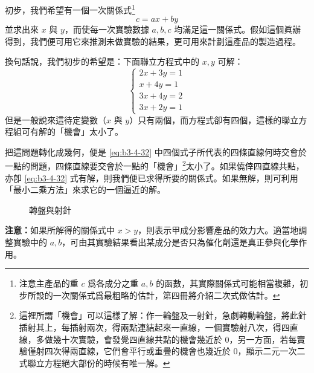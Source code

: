 初步，我們希望有一個一次關係式\footnote{注意主產品的重 $c$ 爲各成分之重 $a, b$ 的函數，其實際關係式可能相當複雜，初步所設的一次關係式爲最粗略的估計，第四冊將介紹二次式做估計。}
\[
c = ax + by
\]
並求出來 $x$ 與 $y$，而使每一次實驗數據 $a, b, c$ 均滿足這一關係式。假如這個眞辦得到，我們便可用它來推測未做實驗的結果，更可用來計劃這產品的製造過程。

換句話說，我們初步的希望是：下面聯立方程式中的 $x, y$ 可解：
\begin{equation}
\begin{cases}
2x + 3y = 1 \\
x + 4y = 1 \\
3x + 4y = 2 \\
3x + 2y = 1
\end{cases}
\label{eq:b3-4-32}
\end{equation}
但是一般說來這待定變數（$x$ 與 $y$）只有兩個，而方程式卻有四個，這樣的聯立方程組可有解的「機會」太小了。

把這問題轉化成幾何，便是 \eqref{eq:b3-4-32} 中四個式子所代表的四條直線何時交會於一點的問題，四條直線要交會於一點的「機會」\footnote{這裡所謂「機會」可以這樣了解：作一輪盤及一射針，急劇轉動輪盤，將此針插射其上，每插射兩次，得兩點連結起來一直線，一個實驗射八次，得四直線，多做幾十次實驗，會發覺四直線共點的機會幾近於 0，另一方面，若每實驗僅射四次得兩直線，它們會平行或重疊的機會也幾近於 0，顯示二元一次二式聯立方程絕大部份的時候有唯一解。}太小了。如果僥倖四直線共點，亦卽 \eqref{eq:b3-4-32} 式有解，則我們便已求得所要的關係式。如果無解，則可利用「最小二乘方法」來求它的一個逼近的解。

\begin{figure}[H]
\centering
{}
\caption{轉盤與射針}
\label{fig:4-41}
\end{figure}

\noindent\textbf{注意：}如果所解得的關係式中 $x > y$，則表示甲成分影響產品的效力大。適當地調整實驗中的 $a, b$，可由其實驗結果看出某成分是否只為催化劑還是真正參與化學作用。

